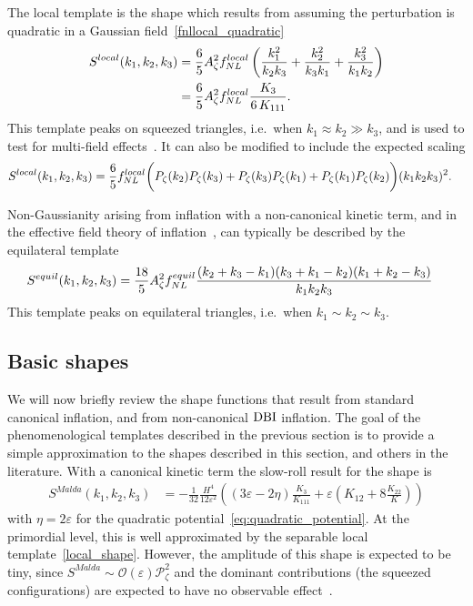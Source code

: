     The local template is the shape which results from assuming the perturbation is
    quadratic in a Gaussian field~\eqref{fnllocal_quadratic}
\begin{align}\label{local_shape}
S^{local}(k_1,k_2,k_3)
    &= \frac{6}{5}A_\zeta^2f^{local}_{NL}\left(\frac{k_1^2}{k_2k_3}+\frac{k_2^2}{k_3k_1}+\frac{k_3^2}{k_1k_2}\right)\\
    &= \frac{6}{5}A_\zeta^2f^{local}_{NL}\frac{K_3}{6\,K_{111}}.
\end{align}
This template peaks on squeezed triangles, i.e.\ when $k_1\approx k_2\gg k_3$,
and is used to test for multi-field effects~\cite{Planck_NG_2015}.
It can also be modified to include the expected scaling
\begin{align}
S^{local}(k_1,k_2,k_3)
    &= \frac{6}{5}f^{local}_{NL}\bigg(
        P_\zeta(k_2)P_\zeta(k_3)
        +P_\zeta(k_3)P_\zeta(k_1)
        +P_\zeta(k_1)P_\zeta(k_2)
    \bigg)(k_1k_2k_3)^2.
\end{align}


    Non-Gaussianity arising from inflation with a non-canonical kinetic term,
    and in the effective field theory of inflation~\cite{Cheung_eft, Baumann_horizon_2011},
    can typically be described by the equilateral template
\begin{align}\label{equil_shape}
    S^{equil}(k_1,k_2,k_3)
    &= \frac{18}{5}A_\zeta^2f^{equil}_{NL}\frac{(k_2+k_3-k_1)(k_3+k_1-k_2)(k_1+k_2-k_3)}{k_1k_2k_3}
\end{align}
This template peaks on equilateral triangles, i.e.\ when $k_1\sim k_2\sim k_3$.


\subsection{Basic shapes}
    We will now briefly review the shape functions that result from
    standard canonical inflation, and from non-canonical $\text{DBI}$ inflation.
    The goal of the phenomenological templates described in the previous
    section is to provide a simple approximation to the shapes described
    in this section, and others in the literature.
    With a canonical kinetic term
    the slow-roll result for the shape is~\cite{Maldacena}
\begin{align}\label{malda_shape}
    S^{Malda}(k_1,k_2,k_3) &= -\frac{1}{32}\frac{H^4}{12\varepsilon^2} \left( (3\varepsilon-2\eta)\frac{K_3}{K_{111}}+\varepsilon \left(K_{12}+8\frac{K_{22}}{K}\right) \right)
\end{align}
with $\eta=2\varepsilon$ for the quadratic potential~\eqref{eq:quadratic_potential}.
At the primordial level, this is well approximated by the separable local template~\eqref{local_shape}.
However, the amplitude of this shape is expected to be tiny,
since $S^{Malda}\sim\mathcal{O}(\varepsilon)\mathcal{P}^2_{\zeta}$
and the dominant contributions (the squeezed configurations) are expected
to have no observable effect~\cite{Cabass_2016}.


